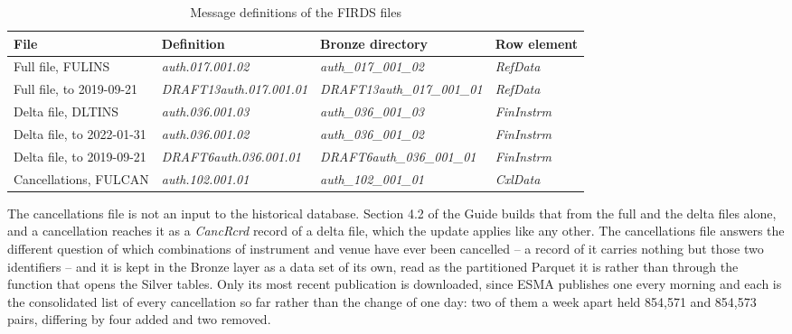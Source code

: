 \begin{table}[h]
\centering
\caption{Message definitions of the FIRDS files\label{tab:firds-definitions}}
\begin{tabular}{llll}
\hline
File & Definition & Bronze directory & Row element \\
\hline
Full file, FULINS & \emph{auth.017.001.02} & \emph{auth\_017\_001\_02} & \emph{RefData} \\
Full file, to 2019-09-21 & \emph{DRAFT13auth.017.001.01} & \emph{DRAFT13auth\_017\_001\_01} & \emph{RefData} \\
Delta file, DLTINS & \emph{auth.036.001.03} & \emph{auth\_036\_001\_03} & \emph{FinInstrm} \\
Delta file, to 2022-01-31 & \emph{auth.036.001.02} & \emph{auth\_036\_001\_02} & \emph{FinInstrm} \\
Delta file, to 2019-09-21 & \emph{DRAFT6auth.036.001.01} & \emph{DRAFT6auth\_036\_001\_01} & \emph{FinInstrm} \\
Cancellations, FULCAN & \emph{auth.102.001.01} & \emph{auth\_102\_001\_01} & \emph{CxlData} \\
\hline
\end{tabular}
\end{table}

The cancellations file is not an input to the historical database. Section 4.2 of the Guide builds that from the full and the delta files alone, and a cancellation reaches it as a \emph{CancRcrd} record of a delta file, which the update applies like any other. The cancellations file answers the different question of which combinations of instrument and venue have ever been cancelled -- a record of it carries nothing but those two identifiers -- and it is kept in the Bronze layer as a data set of its own, read as the partitioned Parquet it is rather than through the function that opens the Silver tables. Only its most recent publication is downloaded, since ESMA publishes one every morning and each is the consolidated list of every cancellation so far rather than the change of one day: two of them a week apart held 854,571 and 854,573 pairs, differing by four added and two removed.

